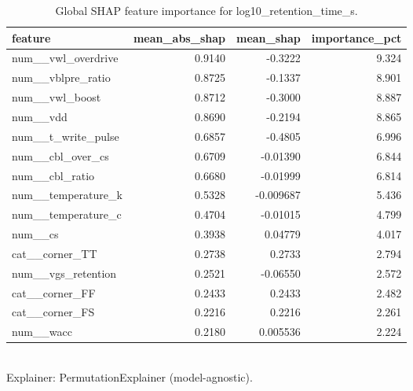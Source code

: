 \begin{table}[!t]
\centering
\caption{Global SHAP feature importance for log10_retention_time_s.}
\label{tab:xai_shap_importance_log10_retention_time_s}
\footnotesize
\begin{tabular}{lrrr}
\toprule
feature & mean\_abs\_shap & mean\_shap & importance\_pct \\
\midrule
num\_\_vwl\_overdrive & 0.9140 & -0.3222 & 9.324 \\
num\_\_vblpre\_ratio & 0.8725 & -0.1337 & 8.901 \\
num\_\_vwl\_boost & 0.8712 & -0.3000 & 8.887 \\
num\_\_vdd & 0.8690 & -0.2194 & 8.865 \\
num\_\_t\_write\_pulse & 0.6857 & -0.4805 & 6.996 \\
num\_\_cbl\_over\_cs & 0.6709 & -0.01390 & 6.844 \\
num\_\_cbl\_ratio & 0.6680 & -0.01999 & 6.814 \\
num\_\_temperature\_k & 0.5328 & -0.009687 & 5.436 \\
num\_\_temperature\_c & 0.4704 & -0.01015 & 4.799 \\
num\_\_cs & 0.3938 & 0.04779 & 4.017 \\
cat\_\_corner\_TT & 0.2738 & 0.2733 & 2.794 \\
num\_\_vgs\_retention & 0.2521 & -0.06550 & 2.572 \\
cat\_\_corner\_FF & 0.2433 & 0.2433 & 2.482 \\
cat\_\_corner\_FS & 0.2216 & 0.2216 & 2.261 \\
num\_\_wacc & 0.2180 & 0.005536 & 2.224 \\
\bottomrule
\end{tabular}
\\[2pt] \footnotesize Explainer: PermutationExplainer (model-agnostic).
\end{table}
